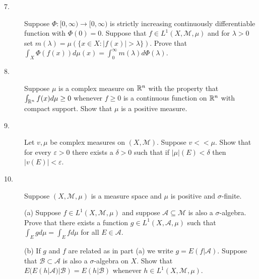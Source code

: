 \documentclass{article}
\begin{document}
\begin{description}
\item[7.]
Suppose $\Phi : [0, \infty) \to [0, \infty)$ is strictly increasing
continuously differentiable function with $\Phi(0) = 0$. Suppose that
$f \in L^1 (X, {\mathcal M}, \mu)$ and for $\lambda > 0$ set
$m(\lambda) = \mu(\{x \in X : |f(x)| > \lambda \})$. Prove that
$\int_X \Phi (f(x)) d \mu (x) = \int^\infty_0 m(\lambda) d \Phi (\lambda)$.

\item[8.]
Suppose $\mu$ is a complex measure on $\Bbb R^n$ with the property that
$\int_{\Bbb R^n} f(x) d\mu \geq 0$ whenever $f \geq 0$ is a continuous
function on $\Bbb R^n$ with compact support. Show that $\mu$ is a positive
measure.

\item[9.]
Let $v, \mu$ be complex measures on $(X,{\mathcal M})$. Suppose $v << \mu$. Show that
for every $\varepsilon >0$ there exists a $\delta > 0$ such that if
$|\mu|(E) < \delta$ then $|v(E)| < \varepsilon$.

\item[10.]
Suppose $(X,{\mathcal M}, \mu)$ is a measure space and $\mu$ is positive and
$\sigma$-finite.

\item[\quad] (a)
Suppose $f \in L^1(X, {\mathcal M}, \mu)$ and suppose
${\mathcal A} \subseteq {\mathcal M}$ is also a
$\sigma$-algebra. Prove that there exists a function
$g \in L^1(X,{\mathcal A}, \mu)$
such that $\int_E gd\mu = \int_E fd \mu$ for all $E \in {\mathcal A}$.

\item[\quad] (b)
If $g$ and $f$ are related as in part (a) we write $g=E(f|{\mathcal A})$.
Suppose that ${\mathcal B} \subset {\mathcal A}$ is also a $\sigma$-algebra
on $X$. Show that $E(E(h|{\mathcal A}) |{\mathcal B}) = E(h|{\mathcal B})$
whenever $h \in L^1(X, {\mathcal M}, \mu)$.

\end{description}    
\end{document}
